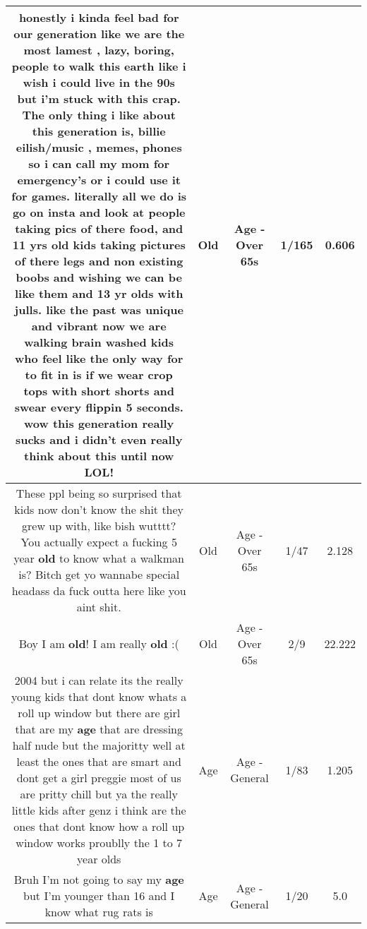 \documentclass[11pt]{article}
\newlength\mylength
\begin{document}
\begin{center}
\begin{longtable}{|C{.65\mylength}|C{.30\mylength}|C{.12\mylength}|C{.12\mylength}|C{.12\mylength}|}
  \small honestly i kinda feel bad for our generation like we are the most lamest , lazy, boring, people to walk this earth like i wish i could live in the 90s  but i'm stuck with this crap.  The only thing i like about this generation is, billie eilish/music , memes, phones so i can call my mom for emergency's or i could use it for games. literally all we do is go on insta and look at people taking pics of there food, and 11 yrs \textbf{old} kids taking pictures of there legs and non existing boobs and wishing we can be like them and 13 yr olds with julls. like the past was unique and vibrant now we are walking brain washed kids who feel like the only way for to fit in is if we wear crop tops with short shorts and swear every flippin 5 seconds.   wow this generation really sucks and i didn't even really think about this until now LOL!\normalsize   & Old & Age - Over 65s & 1/165 & 0.606 \\  \hline
  \small These ppl being so surprised that kids now don't know the shit they grew up with, like bish wutttt? You actually expect a fucking 5 year \textbf{old} to know what a walkman is? Bitch get yo wannabe special headass da fuck outta here like you aint shit.\normalsize   & Old & Age - Over 65s & 1/47 & 2.128 \\  \hline
  \small Boy I am \textbf{old}! I am really \textbf{old} :(\normalsize   & Old & Age - Over 65s & 2/9 & 22.222 \\  \hline
  \small 2004 but i can relate its the really young kids that dont know whats a roll up window but there are girl that are my \textbf{age} that are dressing half nude but the majoritty well at least the ones that are smart and dont get a girl preggie  most of us are pritty chill but ya the really little kids after genz i think are the ones that dont know how a roll up window works proublly the 1 to 7 year olds\normalsize   & Age & Age - General & 1/83 & 1.205 \\  \hline
  \small Bruh I'm not going to say my \textbf{age} but I'm younger than 16 and I know what rug rats is\normalsize   & Age & Age - General & 1/20 & 5.0 \\  \hline

\end{longtable}
\end{center}
\end{document}
